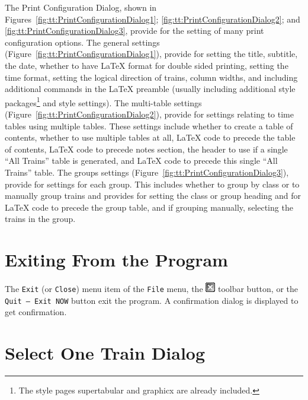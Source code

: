 The Print Configuration Dialog, shown in
Figures~\ref{fig:tt:PrintConfigurationDialog1};
\ref{fig:tt:PrintConfigurationDialog2}; and
\ref{fig:tt:PrintConfigurationDialog3}, provide for the setting of many
print configuration options. The general settings
(Figure~\ref{fig:tt:PrintConfigurationDialog1}), provide for setting the
title, subtitle, the date, whether to have \LaTeX{} format for double
sided printing, setting the time format, setting the logical direction
of trains, column widths, and including additional commands in the
\LaTeX{} preamble (usually including additional style
packages\footnote{The style pages supertabular and graphicx are already
included.} and style settings). The multi-table settings
(Figure~\ref{fig:tt:PrintConfigurationDialog2}), provide for settings
relating to time tables using multiple tables.  These settings include
whether to create a table of contents, whether to use multiple tables at
all, \LaTeX{} code to precede the table of contents, \LaTeX{} code to
precede notes section, the header to use if a single ``All Trains''
table is generated, and \LaTeX{} code to precede this single ``All
Trains'' table.  The groups settings
(Figure~\ref{fig:tt:PrintConfigurationDialog3}), provide for settings
for each group.  This includes whether to group by class or to manually
group trains and provides for setting the class or group heading and for
\LaTeX{} code to precede the group table, and if grouping manually,
selecting the trains in the group.

\section{Exiting From the Program}

The \texttt{Exit} (or \texttt{Close}) menu item of the \texttt{File}
menu, the \includegraphics{TTCloseTool.png} toolbar button, or the
\texttt{Quit -- Exit NOW} button exit the program.  A confirmation
dialog is displayed to get confirmation.

\section{Select One Train Dialog}
\label{sect:tt:SelectOneTrainDialog}

